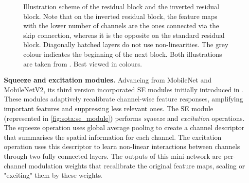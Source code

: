 \begin{figure}[htbp]
  \centering
  \caption{Illustration scheme of the residual block and the inverted residual
  block. Note that on the inverted residual block, the feature maps with the
  lower number of channels are the ones connected via the skip connection,
  whereas it is the opposite on the standard residual block. Diagonally hatched
  layers do not use non-linearities. The grey colour indicates the beginning of
  the next block. Both illustrations are taken from \cite{DongMobileNetV2}. Best
  viewed in colours.}
  \label{fig:sota:inverted_vs_residual_blocks}
\end{figure}


\noindent\textbf{Squeeze and excitation modules.} Advancing from MobileNet and
MobileNetV2, its third version \cite{DBLP:conf/iccv/HowardPALSCWCTC19}
incorporated \ac{SE} modules initially introduced in
\cite{DBLP:conf/cvpr/HuSS18}. These modules adaptively recalibrate channel-wise
feature responses, amplifying important features and suppressing less relevant
ones. The \ac{SE} module (represented in \cref{fig:sota:se_module}) performs
\emph{squeeze} and \emph{excitation} operations. The squeeze operation uses
global average pooling to create a channel descriptor that summarises the
spatial information for each channel. The excitation operation uses this
descriptor to learn non-linear interactions between channels through two fully
connected layers. The outputs of this mini-network are per-channel modulation
weights that recalibrate the original feature maps, scaling or "exciting" them
by these weights.\\

